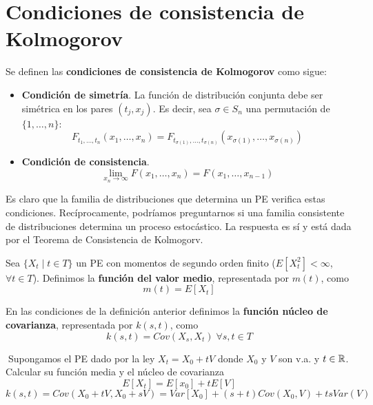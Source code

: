 \documentclass[PREyA.tex]{subfiles}
\begin{document}
\section{Condiciones de consistencia de Kolmogorov}
\begin{defi}
Se definen las \textbf{condiciones de consistencia de Kolmogorov} como sigue:
\begin{itemize}
\item \textbf{Condición de simetría}. La función de distribución conjunta debe ser simétrica en los pares $(t_j,x_j)$. Es decir, sea $\sigma \in S_n$ una permutación de $\{1,\dotsc,n\}$:
$$
F_{t_1,\dotsc,t_n}(x_1,\dotsc,x_n) = F_{t_{\sigma(1)},\dotsc,t_{\sigma(n)}}(x_{\sigma(1)},\dotsc,x_{\sigma(n)})
$$
\item \textbf{Condición de consistencia}.
$$\lim_{x_n \to \infty} F(x_1,\dotsc,x_n) = F(x_1,\dotsc,x_{n-1})
$$

\end{itemize}
\end{defi}
\begin{nota}
Es claro que la familia de distribuciones que determina un PE verifica estas condiciones. Recíprocamente, podríamos preguntarnos si una familia consistente de distribuciones determina un proceso estocástico. La respuesta es sí y está dada por el Teorema de Consistencia de Kolmogorv.
\end{nota}
\begin{defi}
Sea $\{X_t \mid t \in T\}$ un PE con momentos de segundo orden finito ($E[X_t^2] < \infty$, $\forall t \in T$). Definimos la \textbf{función del valor medio}, representada por $m(t)$, como
$$
m(t) = E[X_t]
$$
\end{defi}
\begin{defi}
En las condiciones de la definición anterior definimos la \textbf{función núcleo de covarianza}, representada por $k(s,t)$, como
$$
k(s,t) = Cov(X_s,X_t)\; \forall s,t \in T
$$
\end{defi}
\begin{example}
Supongamos el PE dado por la ley $X_t = X_0 + tV$ donde $X_0$ y $V$ son v.a. y $t\in \mathbb{R}$. Calcular su función media y el núcleo de covarianza
$$
E[X_t] = E[x_0] + tE[V]
$$
$$
k(s,t) =Cov(X_0 + tV, X_0+sV) = Var[X_0] + (s+t)Cov(X_0,V) +ts Var(V)
$$
\end{example}
\end{document}
